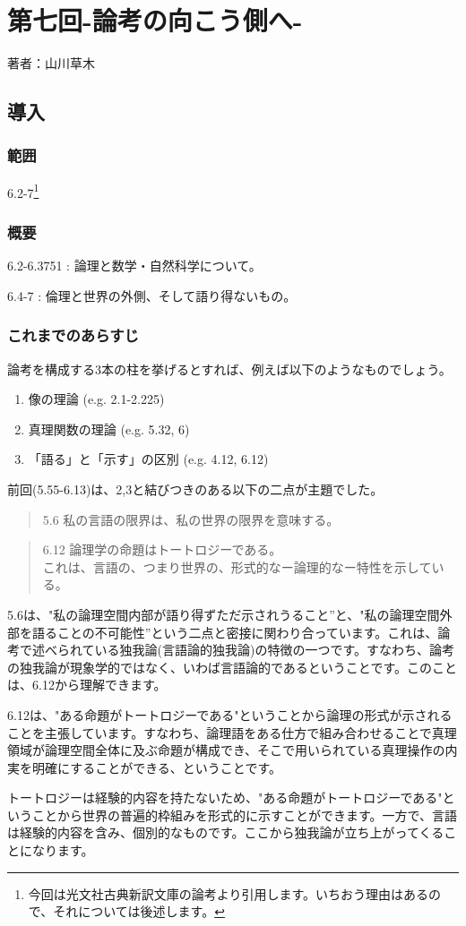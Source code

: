 \documentclass[11pt,a4paper]{jsbook}
\begin{document}
\chapter{第七回-論考の向こう側へ-}

著者：山川草木

\section{導入}
\subsection*{範囲}
6.2-7\footnote{今回は光文社古典新訳文庫の論考より引用します。いちおう理由はあるので、それについては後述します。}\

\subsection*{概要} 
6.2-6.3751 : 論理と数学・自然科学について。\par
6.4-7 : 倫理と世界の外側、そして語り得ないもの。 

\subsection*{これまでのあらすじ}
論考を構成する3本の柱を挙げるとすれば、例えば以下のようなものでしょう。
\begin{enumerate}
\item 像の理論 (e.g. 2.1-2.225)
\item 真理関数の理論 (e.g. 5.32, 6)
\item 「語る」と「示す」の区別 (e.g. 4.12, 6.12)
\end{enumerate}
\par
前回(5.55-6.13)は、2,3と結びつきのある以下の二点が主題でした。
\begin{quote}
5.6 私の言語の限界は、私の世界の限界を意味する。
\end{quote}
\begin{quote}
6.12 論理学の命題はトートロジーである。\\
これは、言語の、つまり世界の、形式的なー論理的なー特性を示している。
\end{quote}
\par
5.6は、"私の論理空間内部が語り得ずただ示されうること”と、"私の論理空間外部を語ることの不可能性”という二点と密接に関わり合っています。これは、論考で述べられている独我論(言語論的独我論)の特徴の一つです。すなわち、論考の独我論が現象学的ではなく、いわば言語論的であるということです。このことは、6.12から理解できます。
\par
6.12は、"ある命題がトートロジーである"ということから論理の形式が示されることを主張しています。すなわち、論理語をある仕方で組み合わせることで真理領域が論理空間全体に及ぶ命題が構成でき、そこで用いられている真理操作の内実を明確にすることができる、ということです。 
\par
トートロジーは経験的内容を持たないため、"ある命題がトートロジーである"ということから世界の普遍的枠組みを形式的に示すことができます。一方で、言語は経験的内容を含み、個別的なものです。ここから独我論が立ち上がってくることになります。 
\end{document}
